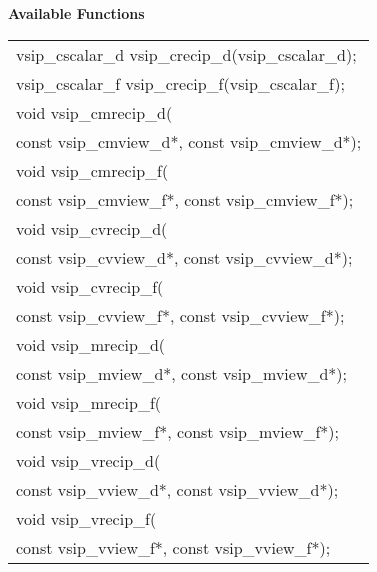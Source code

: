 \cvsiplh
\newline \hspace*{.8cm} \vspace*{.1cm} \textbf{Available Functions }
\newline \hspace*{1.1cm} {
\ttfamily
\begin{tabular}[H]{l}
vsip\_cscalar\_d vsip\_crecip\_d(vsip\_cscalar\_d);\\
vsip\_cscalar\_f vsip\_crecip\_f(vsip\_cscalar\_f);\\
void vsip\_cmrecip\_d(\\*\hspace{.6cm}const vsip\_cmview\_d*, const vsip\_cmview\_d*);\\
void vsip\_cmrecip\_f(\\*\hspace{.6cm}const vsip\_cmview\_f*, const vsip\_cmview\_f*);\\
void vsip\_cvrecip\_d(\\*\hspace{.6cm}const vsip\_cvview\_d*, const vsip\_cvview\_d*);\\
void vsip\_cvrecip\_f(\\*\hspace{.6cm}const vsip\_cvview\_f*, const vsip\_cvview\_f*);\\
void vsip\_mrecip\_d(\\*\hspace{.6cm}const vsip\_mview\_d*, const vsip\_mview\_d*);\\
void vsip\_mrecip\_f(\\*\hspace{.6cm}const vsip\_mview\_f*, const vsip\_mview\_f*);\\
void vsip\_vrecip\_d(\\*\hspace{.6cm}const vsip\_vview\_d*, const vsip\_vview\_d*);\\
void vsip\_vrecip\_f(\\*\hspace{.6cm}const vsip\_vview\_f*, const vsip\_vview\_f*);\\
\end{tabular}
}
\pyjvsiph